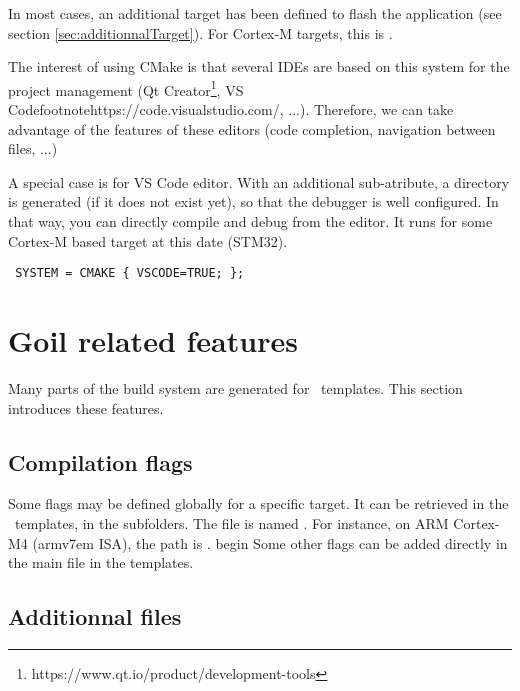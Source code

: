 In most cases, an additional target has been defined to flash the application (see section \ref{sec:additionnalTarget}). For Cortex-M targets, this is .


The interest of using CMake is that several IDEs are based on this system for the project management (Qt Creator{\footnote{https://www.qt.io/product/development-tools}}, VS Code{footnote{https://code.visualstudio.com/}}, ...). Therefore, we can take advantage of the features of these editors (code completion, navigation between files, ...)

A special case is for VS Code editor. With an additional sub-atribute, a  directory is generated (if it does not exist yet), so that the debugger is well configured. In that way, you can directly compile and debug from the editor.
It runs for some Cortex-M based target at this date (STM32).
\lstset{language=OIL}
\begin{lstlisting}
 SYSTEM = CMAKE { VSCODE=TRUE; };
\end{lstlisting}

\section{Goil related features}

Many parts of the build system are generated for \goil\ templates. This section introduces these features.

\subsection{Compilation flags}

Some flags may be defined globally for a specific target. It can be retrieved in the \goil\ templates, in the  subfolders. The file is named . For instance, on ARM Cortex-M4 (armv7em ISA), the path is .
begin
Some other flags can be added directly in the main  file in the templates.

\subsection{Additionnal files}

